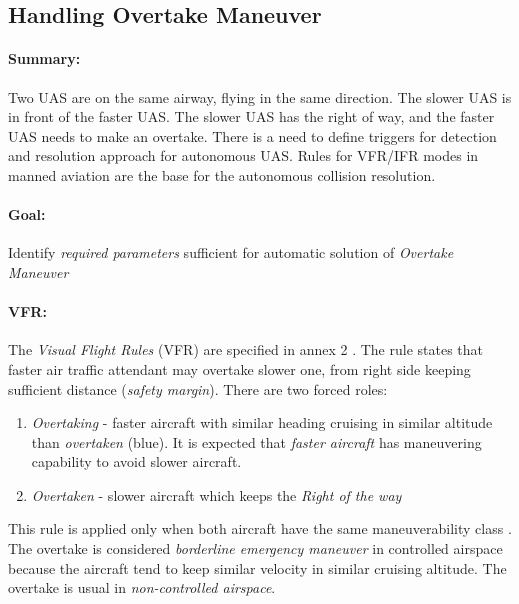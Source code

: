 \subsection{Handling Overtake Maneuver}\label{sec:handlingOvertakeManuever}

\paragraph{Summary:} Two UAS are on the same airway, flying in the same direction. The slower UAS is in front of the faster UAS. The slower UAS has the right of way, and the faster UAS needs to make an overtake. There is a need to define triggers for detection and resolution approach for autonomous UAS.  Rules for VFR/IFR modes in manned aviation are the base for the autonomous collision resolution.

\paragraph{Goal:} Identify \emph{required parameters} sufficient for automatic solution of \emph{Overtake Maneuver}

\paragraph{VFR:} The \emph{Visual Flight Rules} (VFR) are specified in annex 2 \cite{icaoAnnex2}. The rule states that faster air traffic attendant may overtake slower one, from right side keeping sufficient distance (\emph{safety margin}). There are two forced roles:

\begin{enumerate}
    \item \emph{Overtaking} - faster aircraft with similar heading cruising in similar altitude than \emph{overtaken} (blue). It is expected that \emph{faster aircraft} has maneuvering capability to avoid slower aircraft.
    
    \item \emph{Overtaken} - slower aircraft which keeps the \emph{Right of the way}
\end{enumerate}

\begin{note}
    This rule is applied only when both aircraft have the same maneuverability class \cite{icaoAnnex2}. The overtake is considered \emph{borderline emergency maneuver} in controlled airspace because the aircraft tend to keep similar velocity in similar cruising altitude. The overtake is usual in \emph{non-controlled airspace}.
\end{note}


